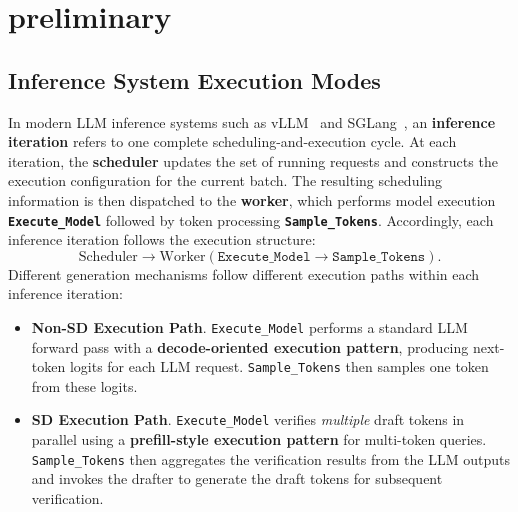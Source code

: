 \section{preliminary}

\subsection{Inference System Execution Modes}
\label{sec:3.1}
In modern LLM inference systems such as vLLM~\citep{vLLM} and SGLang~\citep{SGLang}, an \textbf{inference iteration} refers to one complete scheduling-and-execution cycle. At each iteration, the \textbf{scheduler} updates the set of running requests and constructs the execution configuration for the current batch. The resulting scheduling information is then dispatched to the \textbf{worker}, which performs model execution \textbf{\texttt{Execute\_Model}} followed by token processing \textbf{\texttt{Sample\_Tokens}}. Accordingly, each inference iteration follows the execution structure:
\[
\text{Scheduler}
\rightarrow
\text{Worker}\left(
\texttt{Execute\_Model}
\rightarrow
\texttt{Sample\_Tokens}
\right).
\]
Different generation mechanisms follow different execution paths within each inference iteration:
\begin{itemize}[leftmargin=10pt]
    \item \textbf{Non-SD Execution Path}.
    \texttt{Execute\_Model} performs a standard LLM forward pass with a \textbf{decode-oriented execution pattern}, producing next-token logits for each LLM request. 
    \texttt{Sample\_Tokens} then samples one token from these logits.

    \item \textbf{SD Execution Path}.
    \texttt{Execute\_Model} verifies {\em multiple} draft tokens in parallel using a \textbf{prefill-style execution pattern} for multi-token queries.
    \texttt{Sample\_Tokens} then aggregates the verification results from the LLM outputs and invokes the drafter to generate the draft tokens for subsequent verification.
\end{itemize}
